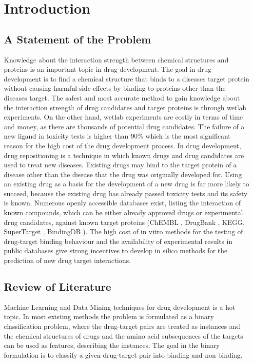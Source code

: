 
\chapter{Introduction}

\section{A Statement of the Problem}

Knowledge about the interaction strength between chemical structures and proteins is an important topic in drug development.
The goal in drug development is to find a chemical structure that binds to a diseases target protein without causing harmful side effects by binding to proteins other than the diseases target.
The safest and most accurate method to gain knowledge about the interaction strength of drug candidates and target proteins is through wetlab experiments. On the other hand, wetlab experiments are costly in terms of time and money, as there are thousands of potential drug candidates. The failure of a new ligand in toxicity tests is higher than $90\%$ which is the most significant reason for the high cost of the drug development process. In drug development, drug repositioning is a technique in which known drugs and drug candidates are used to treat new diseases. Existing drugs may bind to the target protein of a disease other than the disease that the drug was originally developed for. Using an existing drug as a basis for the development of a new drug is far more likely to succeed, because the existing drug has already passed toxicity tests and its safety is known. Numerous openly accessible databases exist, listing the interaction of known compounds, which can be either already approved drugs or experimental drug candidates, against known target proteins (ChEMBL \cite{gaulton2012chembl}, DrugBank \cite{wishart2008drugbank}, KEGG\cite{kanehisa2011kegg}, SuperTarget \cite{gunther2008supertarget}, BindingDB \cite{liu2007bindingdb}). The high cost of in vitro methods for the testing of drug-target binding behaviour and the availability of experimental results in public databases give strong incentives to develop in silico methods for the prediction of new drug target interactions.

\section{Review of Literature}

Machine Learning and Data Mining techniques for drug development is a hot topic. In most existing methods the problem is formulated as a binary classification problem, where the drug-target pairs are treated as instances and the chemical structures of drugs and the amino acid subsequences of the targets can be used as features, describing the instances. The goal in the binary formulation is to classify a given drug-target pair into binding and non binding.

